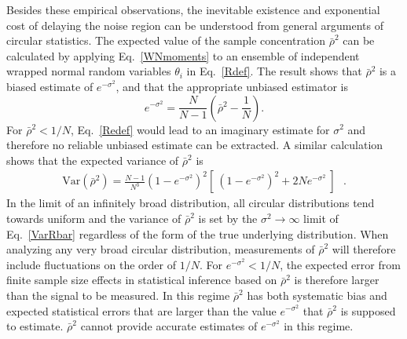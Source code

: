 Besides these empirical observations, the inevitable existence and exponential cost of delaying the noise region 
can be understood from general arguments of circular statistics. 
The expected value of the sample concentration $\bar{\rho}^2$ can be calculated by 
applying Eq.~\eqref{WNmoments} to an ensemble of independent wrapped normal random variables 
$\theta_i$ in Eq.~\eqref{Rdef}. The result shows that $\bar{\rho}^2$ is a biased estimate of $e^{-\sigma^2}$, 
and that the appropriate unbiased estimator is~\cite{Fisher:1995,Mardia:2009}
%
\begin{equation}
  e^{-\sigma^2} = \frac{N}{N-1}\left( \bar{\rho}^2 - \frac{1}{N} \right).
  \label{Redef}
\end{equation}
%
For $\bar{\rho}^2 < 1/N$, Eq.~\eqref{Redef} would lead to an imaginary estimate for $\sigma^2$ and therefore 
no reliable unbiased estimate can be extracted. 
A similar calculation shows that the expected variance of $\bar{\rho}^2$ is
%
\begin{equation}
  \begin{split}
    \text{Var}(\bar{\rho}^2) 
    = 
    \frac{N-1}{N^3}
    \left(1 - e^{-\sigma^2} \right)^2
    \left[\  \left(1 - e^{-\sigma^2} \right)^2 + 2 N e^{-\sigma^2} \ \right]
    \ \ \ .
  \end{split}\label{VarRbar}
\end{equation}
%
In the limit of an infinitely broad distribution, all circular distributions tend towards uniform and the variance 
of $\bar{\rho}^2$ is set by the $\sigma^2\rightarrow\infty$ limit of Eq.~\eqref{VarRbar} regardless of the form of 
the true underlying distribution. When analyzing any very broad circular distribution, measurements of $\bar{\rho}^2$ 
will therefore include fluctuations on the order of $1/N$. For $e^{-\sigma^2} < 1/N$, the expected error from finite 
sample size effects in statistical inference based on $\bar{\rho}^2$ is therefore larger than the signal to be measured. 
In this regime $\bar{\rho}^2$ has both systematic bias and expected statistical errors that are larger than the 
value $e^{-\sigma^2}$ that $\bar{\rho}^2$ is supposed to estimate. $\bar{\rho}^2$ cannot provide accurate 
estimates of $e^{-\sigma^2}$ in this regime.



